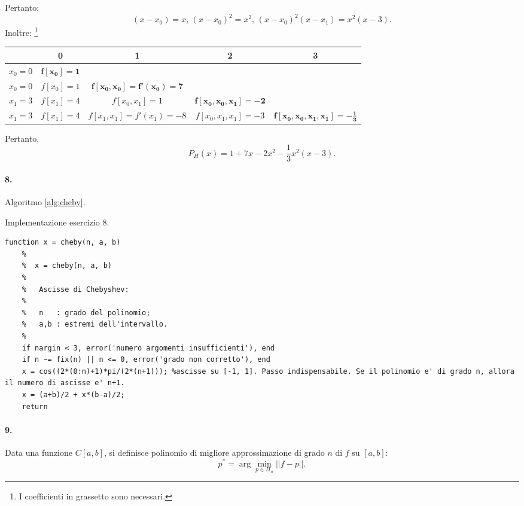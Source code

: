 \noindent Pertanto:
\begin{equation*}
    (x-x_0)=x,\, (x-x_0)^2 = x^2,\, (x-x_0)^2(x-x_1) = x^2(x-3).
\end{equation*}
Inoltre: \footnote{I coefficienti in grassetto sono necessari.}
\begin{center}
    \begin{tabular}{c|cccc}
         & 0 & 1 & 2 & 3\\
         \hline
         $x_0 = 0$ & $\boldsymbol{f[x_0]=1}$\\ 
         $x_0 = 0$ & $f[x_0]=1$ & $\boldsymbol{f[x_0,x_0]=f'(x_0)=7}$\\
         $x_1=3$ & $f[x_1]=4$ & $f[x_0,x_1]=1$ & $\boldsymbol{f[x_0,x_0,x_1]=-2}$\\
         $x_1=3$ & $f[x_1]=4$ & $f[x_1,x_1]=f'(x_1)=-8$ & $f[x_0,x_1,x_1]=-3$ & $\boldsymbol{f[x_0,x_0,x_1,x_1]=-\frac{1}{3}}$
    \end{tabular}
\end{center}
Pertanto,
\begin{equation*}
    P_H(x)=1+7x-2x^2-\frac{1}{3}x^2(x-3).
\end{equation*}

\paragraph{8.} Algoritmo \ref{alg:cheby}.
\begin{algorithm}
\caption{Implementazione esercizio 8.}\label{alg:cheby}
    \begin{lstlisting}[style=Matlab-editor]
    function x = cheby(n, a, b)
    %   
    %  x = cheby(n, a, b)
    %
    %   Ascisse di Chebyshev:
    %
    %   n   : grado del polinomio;
    %   a,b : estremi dell'intervallo.
    %   
    if nargin < 3, error('numero argomenti insufficienti'), end
    if n ~= fix(n) || n <= 0, error('grado non corretto'), end
    x = cos((2*(0:n)+1)*pi/(2*(n+1))); %ascisse su [-1, 1]. Passo indispensabile. Se il polinomio e' di grado n, allora il numero di ascisse e' n+1.
    x = (a+b)/2 + x*(b-a)/2;
    return
    \end{lstlisting}
\end{algorithm}

\paragraph{9.} Data una funzione $C[a,b]$, si definisce polinomio di migliore approssimazione di grado $n$ di $f$ su $[a,b]$:
\begin{equation*}
    p^* = \arg\underset{p\in\Pi_n}{\min}||f-p||.
\end{equation*}

